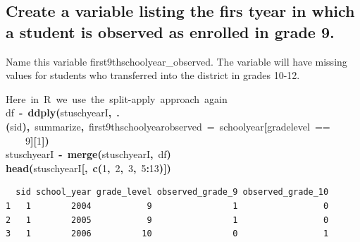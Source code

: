 \documentclass[12pt]{article}
\makeatletter
\newcommand{\hlnumber}[1]{\textcolor[rgb]{0,0,0}{#1}}%
\newcommand{\hlfunctioncall}[1]{\textcolor[rgb]{0.501960784313725,0,0.329411764705882}{\textbf{#1}}}%
\newcommand{\hlkeyword}[1]{\textcolor[rgb]{0,0,0}{\textbf{#1}}}%
\newcommand{\hlargument}[1]{\textcolor[rgb]{0.690196078431373,0.250980392156863,0.0196078431372549}{#1}}%
\newcommand{\hlcomment}[1]{\textcolor[rgb]{0.180392156862745,0.6,0.341176470588235}{#1}}%
\newcommand{\hlassignement}[1]{\textcolor[rgb]{0,0,0}{\textbf{#1}}}%
\newcommand{\hlsymbol}[1]{\textcolor[rgb]{0,0,0}{#1}}%
\newcommand{\hlstd}[1]{\textcolor[rgb]{0,0,0}{#1}}%
\newenvironment{kframe}{%
 \def\FrameCommand##1{\hskip\@totalleftmargin \hskip-\fboxsep
 \colorbox{shadecolor}{##1}\hskip-\fboxsep
     \hskip-\linewidth \hskip-\@totalleftmargin \hskip\columnwidth}%
 \MakeFramed {\advance\hsize-\width
   \@totalleftmargin\z@ \linewidth\hsize
   \@setminipage}}%
 {\par\unskip\endMakeFramed}
\newenvironment{knitrout}{}{} %
\renewenvironment{knitrout}{\begin{footnotesize}}{\end{footnotesize}}
\makeatother
\begin{document}
\subsection{Create a variable listing the firs tyear in which a student is observed as enrolled in grade 9.}
Name this variable first9thschoolyear\_observed. The variable will have missing values for students who transferred into the district in 
grades 10-12.
\begin{knitrout}
\color{fgcolor}\begin{kframe}
\begin{flushleft}
\ttfamily\noindent
\hlcomment{\usebox{\hlnormalsizeboxhash}{\ }Here{\ }in{\ }R{\ }we{\ }use{\ }the{\ }split-apply{\ }approach{\ }again}\hspace*{\fill}\\
\hlstd{}\hlsymbol{df}{\ }\hlassignement{\usebox{\hlnormalsizeboxlessthan}-}{\ }\hlfunctioncall{ddply}\hlkeyword{(}\hlsymbol{stuschyearI}\hlkeyword{,}{\ }\hlfunctioncall{.}\hlkeyword{(}\hlsymbol{sid}\hlkeyword{)}\hlkeyword{,}{\ }\hlsymbol{summarize}\hlkeyword{,}{\ }\hlargument{first9thschoolyear\usebox{\hlnormalsizeboxunderscore}observed}{\ }\hlargument{=}{\ }\hlsymbol{school\usebox{\hlnormalsizeboxunderscore}year}\hlkeyword{[}\hlsymbol{grade\usebox{\hlnormalsizeboxunderscore}level}{\ }==\hspace*{\fill}\\
\hlstd{}{\ }{\ }{\ }{\ }\hlnumber{9}\hlkeyword{]}\hlkeyword{[}\hlnumber{1}\hlkeyword{]}\hlkeyword{)}\hspace*{\fill}\\
\hlstd{}\hlsymbol{stuschyearI}{\ }\hlassignement{\usebox{\hlnormalsizeboxlessthan}-}{\ }\hlfunctioncall{merge}\hlkeyword{(}\hlsymbol{stuschyearI}\hlkeyword{,}{\ }\hlsymbol{df}\hlkeyword{)}\hspace*{\fill}\\
\hlstd{}\hlfunctioncall{head}\hlkeyword{(}\hlsymbol{stuschyearI}\hlkeyword{[}\hlkeyword{,}{\ }\hlfunctioncall{c}\hlkeyword{(}\hlnumber{1}\hlkeyword{,}{\ }\hlnumber{2}\hlkeyword{,}{\ }\hlnumber{3}\hlkeyword{,}{\ }\hlnumber{5}\hlkeyword{:}\hlnumber{13}\hlkeyword{)}\hlkeyword{]}\hlkeyword{)}\mbox{}
\normalfont
\end{flushleft}
\begin{verbatim}
  sid school_year grade_level observed_grade_9 observed_grade_10
1   1        2004           9                1                 0
2   1        2005           9                1                 0
3   1        2006          10                0                 1

\end{verbatim}
\end{kframe}
\end{knitrout}
\end{document}
